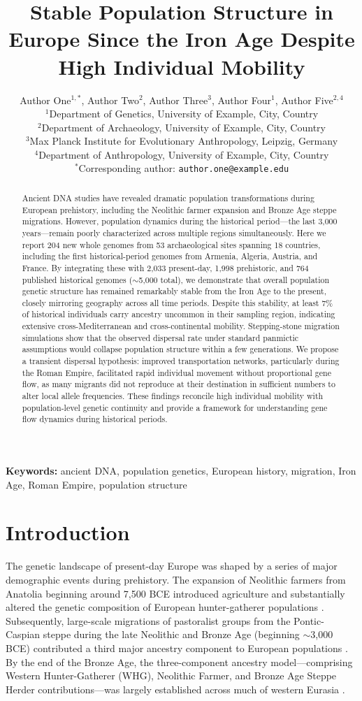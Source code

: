 \documentclass[11pt]{article}
\title{Stable Population Structure in Europe Since the Iron Age Despite High Individual Mobility}
\author{
Author One$^{1,*}$, Author Two$^{2}$, Author Three$^{3}$, Author Four$^{1}$, Author Five$^{2,4}$ \\[6pt]
\small $^{1}$Department of Genetics, University of Example, City, Country \\
\small $^{2}$Department of Archaeology, University of Example, City, Country \\
\small $^{3}$Max Planck Institute for Evolutionary Anthropology, Leipzig, Germany \\
\small $^{4}$Department of Anthropology, University of Example, City, Country \\
\small $^{*}$Corresponding author: \texttt{author.one@example.edu}
}
\date{}
\begin{document}
\maketitle

\begin{abstract}
Ancient DNA studies have revealed dramatic population transformations during European prehistory, including the Neolithic farmer expansion and Bronze Age steppe migrations. However, population dynamics during the historical period---the last 3,000 years---remain poorly characterized across multiple regions simultaneously. Here we report 204 new whole genomes from 53 archaeological sites spanning 18 countries, including the first historical-period genomes from Armenia, Algeria, Austria, and France. By integrating these with 2,033 present-day, 1,998 prehistoric, and 764 published historical genomes ($\sim$5,000 total), we demonstrate that overall population genetic structure has remained remarkably stable from the Iron Age to the present, closely mirroring geography across all time periods. Despite this stability, at least 7\% of historical individuals carry ancestry uncommon in their sampling region, indicating extensive cross-Mediterranean and cross-continental mobility. Stepping-stone migration simulations show that the observed dispersal rate under standard panmictic assumptions would collapse population structure within a few generations. We propose a transient dispersal hypothesis: improved transportation networks, particularly during the Roman Empire, facilitated rapid individual movement without proportional gene flow, as many migrants did not reproduce at their destination in sufficient numbers to alter local allele frequencies. These findings reconcile high individual mobility with population-level genetic continuity and provide a framework for understanding gene flow dynamics during historical periods.
\end{abstract}

\noindent\textbf{Keywords:} ancient DNA, population genetics, European history, migration, Iron Age, Roman Empire, population structure

\section{Introduction}

The genetic landscape of present-day Europe was shaped by a series of major demographic events during prehistory. The expansion of Neolithic farmers from Anatolia beginning around 7,500 BCE introduced agriculture and substantially altered the genetic composition of European hunter-gatherer populations \citep{Lazaridis2014,Haak2015}. Subsequently, large-scale migrations of pastoralist groups from the Pontic-Caspian steppe during the late Neolithic and Bronze Age (beginning $\sim$3,000 BCE) contributed a third major ancestry component to European populations \citep{Haak2015,Allentoft2015,Mathieson2015}. By the end of the Bronze Age, the three-component ancestry model---comprising Western Hunter-Gatherer (WHG), Neolithic Farmer, and Bronze Age Steppe Herder contributions---was largely established across much of western Eurasia \citep{Lazaridis2016}.
\end{document}
